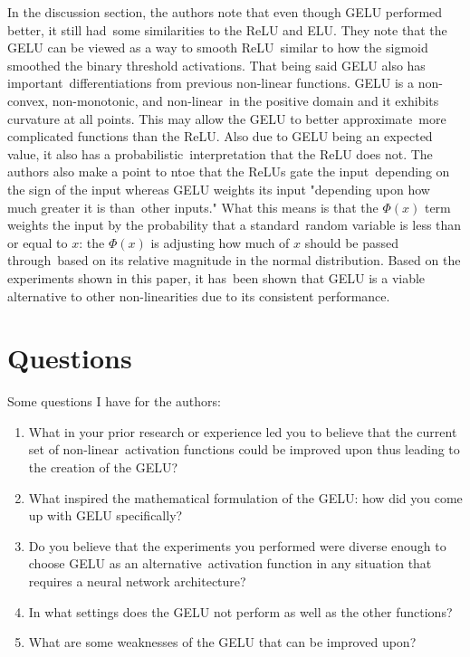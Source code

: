 \documentclass[12pt]{article}
\begin{document}
In the discussion section, the authors note that even though GELU performed better, it still had\
some similarities to the ReLU and ELU. They note that the GELU can be viewed as a way to smooth ReLU\
similar to how the sigmoid smoothed the binary threshold activations. That being said GELU also has important\
differentiations from previous non-linear functions. GELU is a non-convex, non-monotonic, and non-linear\
in the positive domain and it exhibits curvature at all points. This may allow the GELU to better approximate\
more complicated functions than the ReLU. Also due to GELU being an expected value, it also has a probabilistic\
interpretation that the ReLU does not. The authors also make a point to ntoe that the ReLUs gate the input\
depending on the sign of the input whereas GELU weights its input "depending upon how much greater it is than\
other inputs." What this means is that the $\Phi(x)$ term weights the input by the probability that a standard\
random variable is less than or equal to $x$: the $\Phi(x)$ is adjusting how much of $x$ should be passed through\
based on its relative magnitude in the normal distribution. Based on the experiments shown in this paper, it has\
been shown that GELU is a viable alternative to other non-linearities due to its consistent performance.

\section{Questions}

Some questions I have for the authors:

\begin{enumerate}
    \item What in your prior research or experience led you to believe that the current set of non-linear\
        activation functions could be improved upon thus leading to the creation of the GELU?
    \item What inspired the mathematical formulation of the GELU: how did you come up with GELU specifically?
    \item Do you believe that the experiments you performed were diverse enough to choose GELU as an alternative\
        activation function in any situation that requires a neural network architecture?
    \item In what settings does the GELU not perform as well as the other functions?
    \item What are some weaknesses of the GELU that can be improved upon?
\end{enumerate}




\end{document}
